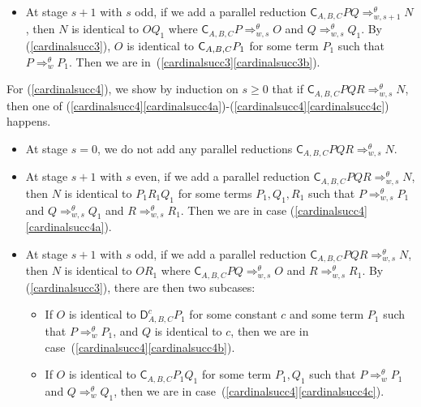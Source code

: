 \documentclass{lmcs} %
\newcommand{\param}{\theta}
\newcommand{\Reduces}[2]{\Rightarrow_{#1}^{#2}}
\newcommand{\ctC}[6]{{\mathsf C}_{#1, #2, #3}#4#5#6}
\newcommand{\ctD}[6]{{\mathsf D}^{#1}_{#2, #3, #4}#5#6}
\begin{document}
\begin{proofdetail}
\begin{itemize}[leftmargin=*]
    \item At stage $s+1$ with $s$ odd, if we add a parallel reduction $\ctC{A}{B}{C}{P}{Q} \Reduces{w,s+1}{\param} N$, then $N$ is identical to $OQ_1$ where $\ctC{A}{B}{C}{P}{} \Reduces{w,s}{\param} O$ and $Q\Reduces{w,s}{\param} Q_1$. By (\ref{cardinalsucc3}), $O$ is identical to $\ctC{A}{B}{C}{P_1}{}$ for some term $P_1$ such that  $P\Reduces{w}{\param} P_1$. Then we are in~(\ref{cardinalsucc3}\ref{cardinalsucc3b}).
\end{itemize}
For (\ref{cardinalsucc4}), we show by induction on   $s\geq 0$ that if $\ctC{A}{B}{C}{P}{Q}{R}\Reduces{w,s}{\param} N$, then one of (\ref{cardinalsucc4}\ref{cardinalsucc4a})-(\ref{cardinalsucc4}\ref{cardinalsucc4c}) happens. 
\begin{itemize}[leftmargin=*]
    \item At stage $s=0$, we do not add any parallel reductions $\ctC{A}{B}{C}{P}{Q}{R}\Reduces{w,s}{\param} N$. 
    \item At stage $s+1$ with $s$ even, if we add a parallel reduction $\ctC{A}{B}{C}{P}{Q}{R}\Reduces{w,s}{\param} N$, then $N$ is identical to $P_1 R_1 Q_1$ for some terms $P_1,Q_1, R_1$ such that $P\Reduces{w,s}{\param} P_1$ and $Q\Reduces{w,s}{\param} Q_1$ and $R\Reduces{w,s}{\param} R_1$. Then we are in case (\ref{cardinalsucc4}\ref{cardinalsucc4a}).
    \item At stage $s+1$ with $s$ odd, if we add a parallel reduction $\ctC{A}{B}{C}{P}{Q}{R}\Reduces{w,s}{\param} N$, then $N$ is identical to $OR_1$ where  $\ctC{A}{B}{C}{P}{Q}{}\Reduces{w,s}{\param} O$ and  $R\Reduces{w,s}{\param} R_1$. By (\ref{cardinalsucc3}), there are then two subcases:
\begin{itemize}[leftmargin=*]
\item If $O$ is identical to $\ctD{c}{A}{B}{C}{P_1}{}$ for some constant $c$ and some term $P_1$ such that $P\Reduces{w}{\param} P_1$, and $Q$ is identical to $c$, then we are in case~(\ref{cardinalsucc4}\ref{cardinalsucc4b}).
\item If $O$ is identical to $\ctC{A}{B}{C}{P_1}{Q_1}{}$ for some term $P_1,Q_1$ such that $P\Reduces{w}{\param} P_1$ and $Q\Reduces{w}{\param} Q_1$, then we are in case~(\ref{cardinalsucc4}\ref{cardinalsucc4c}).
\end{itemize}
\end{itemize}


\end{proofdetail}
\end{document}

